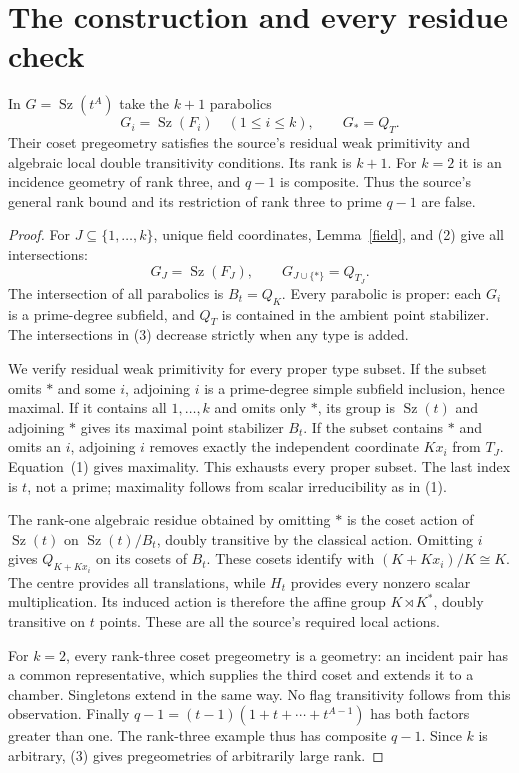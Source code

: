\documentclass[11pt,a4paper]{article}
\newcommand{\Sz}{\operatorname{Sz}}\newcommand{\F}{\mathbb F}
\begin{document}
\section{The construction and every residue check}
\begin{theorem}\label{family}
In $G=\Sz(t^A)$ take the $k+1$ parabolics
\[
 G_i=\Sz(F_i)\quad(1\le i\le k),\qquad G_*=Q_T.
\]
Their coset pregeometry satisfies the source's residual weak primitivity
and algebraic local double transitivity conditions. Its rank is $k+1$.
For $k=2$ it is an incidence geometry of rank three, and $q-1$ is
composite. Thus the source's general rank bound and its restriction
of rank three to prime $q-1$ are false.
\end{theorem}
\begin{proof}
For $J\subseteq\{1,\ldots,k\}$, unique field coordinates,
Lemma~\ref{field}, and (2) give all intersections:
\[
 G_J=\Sz(F_J),\qquad G_{J\cup\{*\}}=Q_{T_J}.          \tag{3}
\]
The intersection of all parabolics is $B_t=Q_K$. Every parabolic
is proper: each $G_i$ is a prime-degree subfield, and $Q_T$ is
contained in the ambient point stabilizer. The intersections in (3)
decrease strictly when any type is added.

We verify residual weak primitivity for every proper type subset.
If the subset omits $*$ and some $i$, adjoining $i$ is a prime-degree
simple subfield inclusion, hence maximal. If it contains all
$1,\ldots,k$ and omits only $*$, its group is $\Sz(t)$ and adjoining
$*$ gives its maximal point stabilizer $B_t$. If the subset contains
$*$ and omits an $i$, adjoining $i$ removes exactly the independent
coordinate $Kx_i$ from $T_J$. Equation~(1) gives maximality.
This exhausts every proper subset. The last index is $t$, not a prime;
maximality follows from scalar irreducibility as in (1).

The rank-one algebraic residue obtained by omitting $*$ is the
coset action of $\Sz(t)$ on $\Sz(t)/B_t$, doubly transitive by the
classical action. Omitting $i$ gives $Q_{K+Kx_i}$ on its cosets of
$B_t$. These cosets identify with $(K+Kx_i)/K\cong K$.
The centre provides all translations, while $H_t$ provides every
nonzero scalar multiplication. Its induced action is therefore the
affine group $K\rtimes K^*$, doubly transitive on $t$ points.
These are all the source's required local actions.

For $k=2$, every rank-three coset pregeometry is a geometry: an
incident pair has a common representative, which supplies the third
coset and extends it to a chamber. Singletons extend in the same way.
No flag transitivity follows from this observation. Finally
$q-1=(t-1)(1+t+\cdots+t^{A-1})$ has both factors greater than one.
The rank-three example thus has composite $q-1$. Since $k$ is
arbitrary, (3) gives pregeometries of arbitrarily large rank.
\end{proof}
\end{document}

